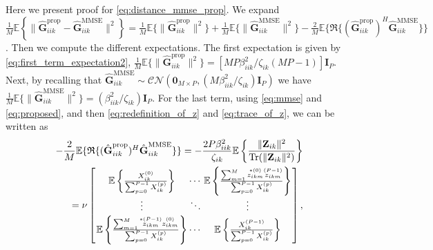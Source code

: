\documentclass[journal,12pt,onecolumn]{IEEEtran}
\DeclareMathOperator{\Tr}{Tr}
\begin{document}
\section{}
Here we present proof for \eqref{eq:distance_mmse_prop}. We expand $\frac{1}{M} \mathbb{E} \left\lbrace \lVert \hat{\textbf{G}}_{iik}^{\text{prop}} - \hat{\textbf{G}}_{iik}^{\text{MMSE}} \rVert^{2} \right\rbrace = \frac{1}{M}\mathbb{E}\{ \lVert \hat{\textbf{G}}_{iik}^{\text{prop}} \rVert^{2} \} + \frac{1}{M}\mathbb{E}\{ \lVert \hat{\textbf{G}}_{iik}^{\text{MMSE}} \rVert^{2} \} - \frac{2}{M}\mathbb{E} \{\mathfrak{R}\{ (\hat{\textbf{G}}_{iik}^{\text{prop}})^{H} \hat{\textbf{G}}_{iik}^{\text{MMSE}} \}\}$. Then we compute the different expectations. The first expectation is given by \eqref{eq:first_term_expectation2}, $\frac{1}{M}\mathbb{E}\{ \lVert \hat{\textbf{G}}_{iik}^{\text{prop}} \rVert^{2} \} = \left[ {MP \beta_{iik}^{2}} / {\zeta_{ik}(MP-1)} \right] \textbf{I}_{P}$. Next, by recalling that $\hat{\textbf{G}}_{iik}^{\text{MMSE}} \sim \mathcal{CN}(\textbf{0}_{M \times P}, ({M \beta_{iik}^{2}} / {\zeta_{ik}} )  \textbf{I}_{P})$ we have $\frac{1}{M}\mathbb{E}\{ \lVert \hat{\textbf{G}}_{iik}^{\text{MMSE}} \rVert^{2} \} = ( {\beta_{iik}^{2}}  / {\zeta_{ik}} ) \textbf{I}_{P}$. For the last term, using \eqref{eq:mmse} and \eqref{eq:proposed}, and then \eqref{eq:redefinition_of_z} and \eqref{eq:trace_of_z}, we can be written as
\begin{equation}\label{eq:appendix_b_1}
\begin{split}
-\frac{2}{M}\mathbb{E} \{\mathfrak{R}\{ (\hat{\textbf{G}}_{iik}^{\text{prop}})^{H} \hat{\textbf{G}}_{iik}^{\text{MMSE}} \}\} = -\frac{2P \beta_{iik}^{2}}{\zeta_{ik}} \mathbb{E} \left\lbrace \frac{\lVert \textbf{Z}_{ik} \rVert^2}{ \Tr ( \lVert \textbf{Z}_{ik} \rVert^{2} ) } \right\rbrace \\ = \nu \arraycolsep=1pt\def\arraystretch{1.5} \left[\begin{array}{ccc}
\mathbb{E} \left\lbrace \frac{ X_{ik}^{(0)} }{ \sum_{p=0}^{P-1} X_{ik}^{(p)} } \right\rbrace & \cdots & \mathbb{E} \left\lbrace \frac{ \sum_{m=1}^{M}{ \overset{*(0)}{{z}_{ikm}} \overset{(P-1)}{{z}_{ikm}} } }{ \sum_{p=0}^{P-1} X_{ik}^{(p)} } \right\rbrace \\
\vdots & \ddots & \vdots \\ 
\mathbb{E} \left\lbrace \frac{ \sum_{m=1}^{M}{ \overset{*(P-1)}{{z}_{ikm}} \overset{(0)}{{z}_{ikm}} } }{ \sum_{p=0}^{P-1} X_{ik}^{(p)} } \right\rbrace & \cdots & \mathbb{E} \left\lbrace \frac{ X_{ik}^{(P-1)} }{ \sum_{p=0}^{P-1} X_{ik}^{(p)} } \right\rbrace  \end{array} \right],
\end{split}
\end{equation}
\end{document}
